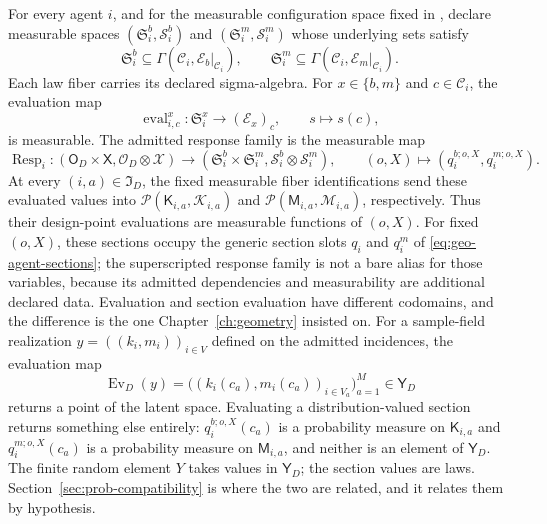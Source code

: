 For every agent \(i\), and for the measurable configuration space fixed in
, declare measurable spaces
\((\mathfrak S_i^b,\mathscr S_i^b)\) and
\((\mathfrak S_i^m,\mathscr S_i^m)\) whose underlying sets satisfy
\[
\mathfrak S_i^b
\subseteq\Gamma(\mathcal C_i,\mathcal E_b|_{\mathcal C_i}),
\qquad
\mathfrak S_i^m
\subseteq\Gamma(\mathcal C_i,\mathcal E_m|_{\mathcal C_i}).
\]
Each law fiber carries its declared sigma-algebra. For
\(x\in\{b,m\}\) and \(c\in\mathcal C_i\), the evaluation map
\[
\operatorname{eval}_{i,c}^{x}:\mathfrak S_i^x\longrightarrow(\mathcal E_x)_c,
\qquad
s\longmapsto s(c),
\]
is measurable. The admitted response family is the measurable map
\begin{equation}
\operatorname{Resp}_i:
(\mathsf O_D\times\mathsf X,\mathscr O_D\otimes\mathscr X)
\longrightarrow
(\mathfrak S_i^b\times\mathfrak S_i^m,
 \mathscr S_i^b\otimes\mathscr S_i^m),
\qquad
(o,X)\longmapsto(q_i^{b;o,X},q_i^{m;o,X}).
\label{eq:prob-context-section-response}
\end{equation}
At every \((i,a)\in\mathfrak I_D\), the fixed measurable fiber identifications send
these evaluated values into
\(\mathcal P(\mathsf K_{i,a},\mathscr K_{i,a})\) and
\(\mathcal P(\mathsf M_{i,a},\mathscr M_{i,a})\), respectively. Thus their
design-point evaluations are measurable functions of \((o,X)\). For fixed
\((o,X)\), these sections occupy the generic section slots \(q_i\) and \(q_i^m\)
of \eqref{eq:geo-agent-sections}; the superscripted response family is not a
bare alias for those variables, because its admitted dependencies and
measurability are additional declared data. 
\medskip
Evaluation and section evaluation have different codomains, and the difference is the one Chapter~\ref{ch:geometry} insisted on. For a sample-field realization $y=((k_i,m_i))_{i\in V}$ defined on the admitted incidences, the evaluation map
\begin{equation}
\operatorname{Ev}_D(y)=\bigl((k_i(c_a),m_i(c_a))_{i\in V_a}\bigr)_{a=1}^{M}\in\mathsf Y_D
\label{eq:prob-evaluation-map}
\end{equation}
returns a point of the latent space. Evaluating a distribution-valued section returns something else entirely: $q_i^{b;o,X}(c_a)$ is a probability measure on $\mathsf K_{i,a}$ and $q_i^{m;o,X}(c_a)$ is a probability measure on $\mathsf M_{i,a}$, and neither is an element of $\mathsf Y_D$. The finite random element $Y$ takes values in $\mathsf Y_D$; the section values are laws. Section~\ref{sec:prob-compatibility} is where the two are related, and it relates them by hypothesis.

